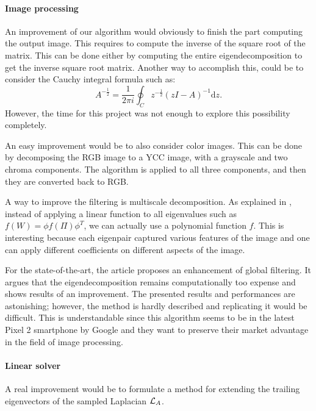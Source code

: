 \paragraph{Image processing}
An improvement of our algorithm would obviously to finish the part computing the output image.
This requires to compute the inverse of the square root of the matrix.
This can be done either by computing the entire eigendecomposition to get the inverse square root matrix.
Another way to accomplish this, could be to consider the Cauchy integral formula such as:
\[A^{-\frac{1}{2}} = \frac{1}{2\pi i} \oint_C z^{-\frac{1}{2}} (zI - A)^{-1} \mathrm{d}z.\]
However, the time for this project was not enough to explore this possibility completely.

An easy improvement would be to also consider color images.
This can be done by decomposing the RGB image to a YCC image, with a grayscale and two chroma components.
The algorithm is applied to all three components, and then they are converted back to RGB.

A way to improve the filtering is multiscale decomposition.
As explained in \cite{talebi_nonlocal_2014}, instead of applying a linear function to all eigenvalues such as \(f(W) = \phi f(\Pi) \phi^T\), we can actually use a polynomial function \(f\).
This is interesting because each eigenpair captured various features of the image and one can apply different coefficients on different aspects of the image.

For the state-of-the-art, the article \cite{talebi_fast_2016} proposes an enhancement of global filtering.
It argues that the eigendecomposition remains computationally too expense and shows results of an improvement.
The presented results and performances are astonishing; however, the method is hardly described and replicating it would be difficult.
This is understandable since this algorithm seems to be in the latest Pixel 2 smartphone by Google and they want to preserve their market advantage in the field of image processing.

\paragraph{Linear solver}
A real improvement would be to formulate a method for extending the trailing eigenvectors of the sampled Laplacian \(\operatorname{\mathcal{L}}_A\).
